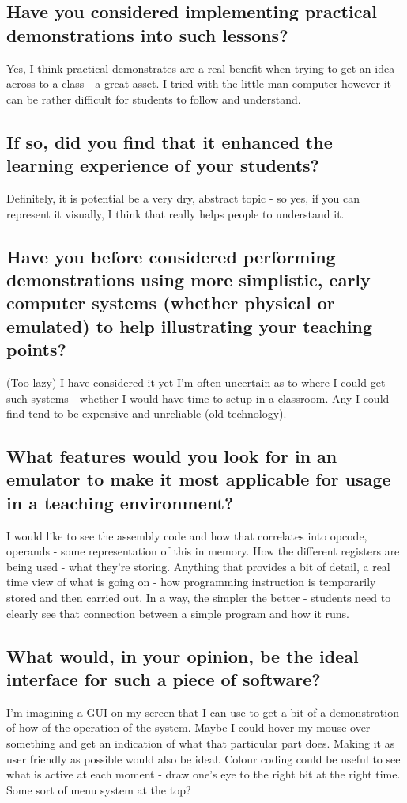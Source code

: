     \subsection{Have you considered implementing practical demonstrations into such lessons?}
        Yes, I think practical demonstrates are a real benefit when trying to get an idea across to a class - a great asset. I tried with the little man computer however it can be rather difficult for students to follow and understand.

    \subsection{If so, did you find that it enhanced the learning experience of your students?}
        Definitely, it is potential be a very dry, abstract topic - so yes, if you can represent it visually, I think that really helps people to understand it.
    
    \subsection{Have you before considered performing demonstrations using more simplistic, early computer systems (whether physical or emulated) to help illustrating your teaching points?}
        (Too lazy) I have considered it yet I'm often uncertain as to where I could get such systems - whether I would have time to setup in a classroom. Any I could find tend to be expensive and unreliable (old technology).
    
    \subsection{What features would you look for in an emulator to make it most applicable for usage in a teaching environment?}
        I would like to see the assembly code and how that correlates into opcode, operands - some representation of this in memory. How the different registers are being used - what they're storing. Anything that provides a bit of detail, a real time view of what is going on - how programming instruction is temporarily stored and then carried out. In a way, the simpler the better - students need to clearly see that connection between a simple program and how it runs.
    
    \subsection{What would, in your opinion, be the ideal interface for such a piece of software?}
        I'm imagining a GUI on my screen that I can use to get a bit of a demonstration of how of the operation of the system. Maybe I could hover my mouse over something and get an indication of what that particular part does. Making it as user friendly as possible would also be ideal. Colour coding could be useful to see what is active at each moment - draw one's eye to the right bit at the right time. Some sort of menu system at the top?


